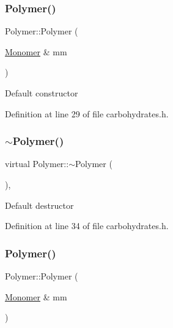 \subsubsection{\texorpdfstring{Polymer()}{Polymer()}\hspace{0.1cm}{\footnotesize\ttfamily [1/14]}}
{\footnotesize\ttfamily Polymer\+::\+Polymer (\begin{DoxyParamCaption}\item[{\mbox{\hyperlink{class_monomer}{Monomer}} \&}]{mm }\end{DoxyParamCaption})\hspace{0.3cm}{\ttfamily [inline]}}

Default constructor 

Definition at line 29 of file carbohydrates.\+h.

\mbox{\label{class_polymer_aac2b3983f375a5691c7d5ca1a79594d5}} 
\subsubsection{\texorpdfstring{$\sim$\+Polymer()}{~Polymer()}\hspace{0.1cm}{\footnotesize\ttfamily [1/11]}}
{\footnotesize\ttfamily virtual Polymer\+::$\sim$\+Polymer (\begin{DoxyParamCaption}{ }\end{DoxyParamCaption})\hspace{0.3cm}{\ttfamily [inline]}, {\ttfamily [virtual]}}

Default destructor 

Definition at line 34 of file carbohydrates.\+h.

\mbox{\label{class_polymer_ae77454a3908652e4df6a26b9cac509a5}} 
\subsubsection{\texorpdfstring{Polymer()}{Polymer()}\hspace{0.1cm}{\footnotesize\ttfamily [2/14]}}
{\footnotesize\ttfamily Polymer\+::\+Polymer (\begin{DoxyParamCaption}\item[{\mbox{\hyperlink{class_monomer}{Monomer}} \&}]{mm }\end{DoxyParamCaption})\hspace{0.3cm}{\ttfamily [inline]}}

